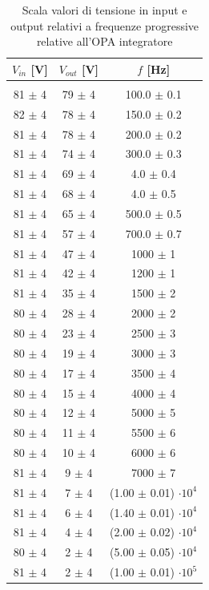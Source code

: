 \documentclass[journal]{IEEEtran}
\begin{document}
\begin{table}[H]
\centering
    
\begin{tabular}{c|c|c}
\multicolumn{1}{c|}{$V_{in}$ {[}V{]}} & \multicolumn{1}{|c|}{$V_{out}$ {[}V{]}} & \multicolumn{1}{c}{$f$ {[}Hz{]}}\\ 
\hline  \\
81 $\pm$ 4 & 79 $\pm$ 4 & 100.0 $\pm$ 0.1      \\
82 $\pm$ 4 & 78 $\pm$ 4 & 150.0 $\pm$ 0.2     \\
81 $\pm$ 4 & 78 $\pm$ 4 & 200.0 $\pm$ 0.2      \\
81 $\pm$ 4 & 74 $\pm$ 4 & 300.0 $\pm$ 0.3      \\
81 $\pm$ 4 & 69 $\pm$ 4 & 4.0 $\pm$ 0.4      \\
81 $\pm$ 4 & 68 $\pm$ 4 & 4.0 $\pm$ 0.5     \\
81 $\pm$ 4 & 65 $\pm$ 4 & 500.0 $\pm$ 0.5      \\
81 $\pm$ 4 & 57 $\pm$ 4 & 700.0 $\pm$ 0.7      \\
81 $\pm$ 4 & 47 $\pm$ 4 & 1000 $\pm$ 1     \\
81 $\pm$ 4 & 42 $\pm$ 4 & 1200 $\pm$ 1     \\
81 $\pm$ 4 & 35 $\pm$ 4 & 1500 $\pm$ 2     \\
80 $\pm$ 4 & 28 $\pm$ 4 & 2000 $\pm$ 2     \\
80 $\pm$ 4 & 23 $\pm$ 4 & 2500 $\pm$ 3     \\
80 $\pm$ 4 & 19 $\pm$ 4 & 3000 $\pm$ 3     \\
80 $\pm$ 4 & 17 $\pm$ 4 & 3500 $\pm$ 4     \\
80 $\pm$ 4 & 15 $\pm$ 4 & 4000 $\pm$ 4     \\
80 $\pm$ 4 & 12 $\pm$ 4 & 5000 $\pm$ 5     \\
80 $\pm$ 4 & 11 $\pm$ 4 & 5500 $\pm$ 6    \\
80 $\pm$ 4 & 10 $\pm$ 4 & 6000 $\pm$ 6     \\
81 $\pm$ 4 & 9 $\pm$ 4  & 7000 $\pm$ 7     \\
81 $\pm$ 4 & 7 $\pm$ 4  & (1.00 $\pm$ 0.01) $\cdot 10^4$   \\
81 $\pm$ 4 & 6 $\pm$ 4  & (1.40 $\pm$ 0.01) $\cdot 10^4$    \\
81 $\pm$ 4 & 4 $\pm$ 4  & (2.00 $\pm$ 0.02) $\cdot 10^4$    \\
80 $\pm$ 4 & 2 $\pm$ 4  & (5.00 $\pm$ 0.05) $\cdot 10^4$    \\
81 $\pm$ 4 & 2 $\pm$ 4  & (1.00 $\pm$ 0.01) $\cdot 10^5$ 
\end{tabular}
\vspace{5 mm}
\caption{Scala valori di tensione in input e output relativi a frequenze progressive relative all'OPA integratore}
\label{tab:opa-non-inv}
\end{table}
\end{document}
